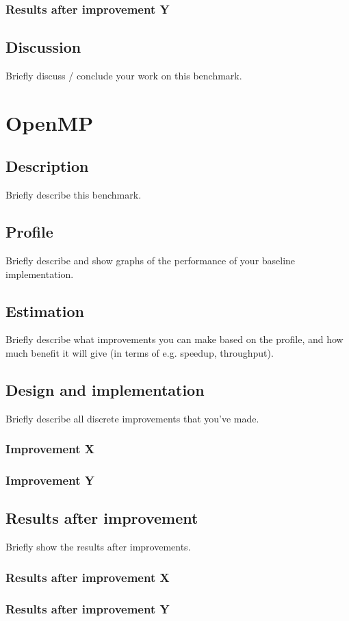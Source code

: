 \documentclass[twocolumn]{article}
\begin{document}
\subsubsection{Results after improvement Y}
\subsection{Discussion}
Briefly discuss / conclude your work on this benchmark.

\section{OpenMP}
\subsection{Description}
Briefly describe this benchmark.
\subsection{Profile}
Briefly describe and show graphs of the performance of your baseline implementation.
\subsection{Estimation}
Briefly describe what improvements you can make based on the profile, and how much benefit it will give (in terms of e.g. speedup, throughput).
\subsection{Design and implementation}
Briefly describe all discrete improvements that you've made.
\subsubsection{Improvement X}
\subsubsection{Improvement Y}
\subsection{Results after improvement}
Briefly show the results after improvements.
\subsubsection{Results after improvement X}
\subsubsection{Results after improvement Y}
\end{document}
